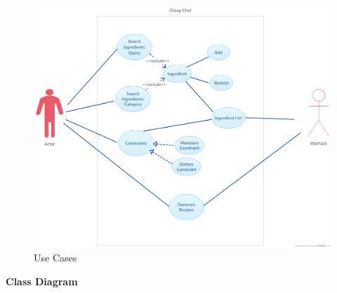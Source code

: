 \documentclass[12pt]{article}
\begin{document}
\newpage
\begin{figure}
  \includegraphics[width=\linewidth]{usecases.png}
  \caption{Use Cases}
  \label{fig: usecases}
\end{figure}

\newpage
\begin{center}
  \textbf{Class Diagram}
\end{center}
\end{document}
